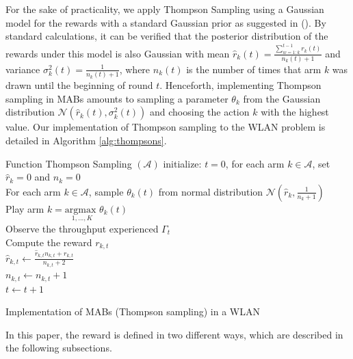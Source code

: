 \documentclass[preprint,12pt]{elsarticle}
\begin{document}
For the sake of practicality, we apply Thompson Sampling using a Gaussian model for the rewards with a standard Gaussian prior as suggested in (\citealp{agrawal2013further}). By standard calculations, it can be verified that the posterior distribution of the rewards under this model is also Gaussian with mean $\hat{r}_k(t) = \frac{\sum_{w=1:k}^{t-1} r_k(t) }{n_k(t) + 1}$ and variance $\sigma_k^2(t) = \frac{1}{n_k(t) + 1}$, where $n_k(t)$ is the number of times that arm $k$ was drawn until the beginning of round $t$. Henceforth, implementing Thompson sampling in MABs amounts to sampling a parameter $\theta_k$ from the Gaussian distribution $\mathcal{N}\left(\hat{r}_k(t),\sigma_k^2(t)\right)$ and choosing the action $k$ with the highest value. Our implementation of Thompson sampling to the WLAN problem is detailed in Algorithm \ref{alg:thompsons}.	
\begin{algorithm}[h!]
	Function Thompson Sampling $(\mathcal{A})$\;
	initialize: $t=0$,  for each arm $k \in \mathcal{A}$, set $\hat{r}_{k} = 0$ and $n_k = 0$ \\
	{
		For each arm $k \in \mathcal{A}$, sample $\theta_k(t)$ from normal distribution $\mathcal{N}(\hat{r}_{k}, \frac{1}{n_k + 1})$ \\
		Play arm $k = \underset{1,...,K}{\text{argmax }} \theta_k(t) $ \\
		Observe the throughput experienced $\Gamma_t$\\			
		Compute the reward $r_{k,t}$ \\
		$ \hat{r}_{k,t} \leftarrow \frac{\hat{r}_{k,t}  n_{k,t} + r_{k,t}}{n_{k,t} + 2}$\\
		$n_{k,t} \leftarrow n_{k,t} + 1$\\
		$t \leftarrow t + 1$
	}
	\caption{Implementation of MABs (Thompson sampling) in a WLAN}
	\label{alg:thompsons}
\end{algorithm}	

In this paper, the reward is defined in two different ways, which are described in the following subsections.

\end{document}
